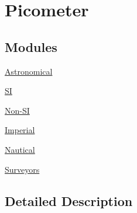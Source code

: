 \hypertarget{group___e_g_x_math-_conversions-_length_conversions-_s_i-_picometer}{}\section{Picometer}
\label{group___e_g_x_math-_conversions-_length_conversions-_s_i-_picometer}
\subsection*{Modules}
\begin{DoxyCompactItemize}
\item 
\mbox{\hyperlink{group___e_g_x_math-_conversions-_length_conversions-_s_i-_picometer-_astronomical}{Astronomical}}
\item 
\mbox{\hyperlink{group___e_g_x_math-_conversions-_length_conversions-_s_i-_picometer-_s_i}{SI}}
\item 
\mbox{\hyperlink{group___e_g_x_math-_conversions-_length_conversions-_s_i-_picometer-_non-_s_i}{Non-\/\+SI}}
\item 
\mbox{\hyperlink{group___e_g_x_math-_conversions-_length_conversions-_s_i-_picometer-_imperial}{Imperial}}
\item 
\mbox{\hyperlink{group___e_g_x_math-_conversions-_length_conversions-_s_i-_picometer-_nautical}{Nautical}}
\item 
\mbox{\hyperlink{group___e_g_x_math-_conversions-_length_conversions-_s_i-_picometer-_surveyors}{Surveyors}}
\end{DoxyCompactItemize}


\subsection{Detailed Description}
